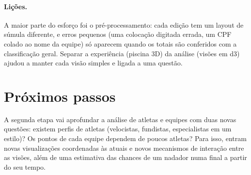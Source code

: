 \documentclass[11pt,a4paper]{article}
\begin{document}
\paragraph{Lições.} A maior parte do esforço foi o pré-processamento: cada edição tem um layout de súmula diferente,
e erros pequenos (uma colocação digitada errada, um CPF colado ao nome da equipe) só aparecem quando os totais
são conferidos com a classificação geral. Separar a experiência (piscina 3D) da análise (visões em d3) ajudou a
manter cada visão simples e ligada a uma questão.

\section{Próximos passos}\label{sec:prox}

A segunda etapa vai aprofundar a análise de atletas e equipes com duas novas questões: existem perfis de atletas
(velocistas, fundistas, especialistas em um estilo)? Os pontos de cada equipe dependem de poucos atletas? Para
isso, entram novas visualizações coordenadas às atuais e novos mecanismos de interação entre as visões, além de
uma estimativa das chances de um nadador numa final a partir do seu tempo.
\end{document}
